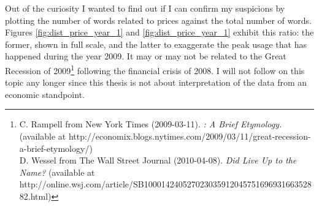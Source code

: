     Out of the curiosity I wanted to find out if I can confirm my suspicions by plotting the number of words related to prices against the total number of words. Figures \ref{fig:dist_price_year_1} and \ref{fig:dist_price_year_1} exhibit this ratio: the former, shown in full scale, and the latter  to exaggerate the peak usage that has happened during the year 2009. It may or may not be related to the Great Recession of 2009\footnote{C. Rampell from New York Times (2009-03-11). \emph{: A Brief Etymology.} (available at http://economix.blogs.nytimes.com/2009/03/11/great-recession-a-brief-etymology/) \\ D. Wessel from The Wall Street Journal (2010-04-08). \emph{Did  Live Up to the Name?} (available at http://online.wsj.com/article/SB10001424052702303591204575169693166352882.html)} following the financial crisis of 2008. I will not follow on this topic any longer since this thesis is not about interpretation of the data from an economic standpoint.
